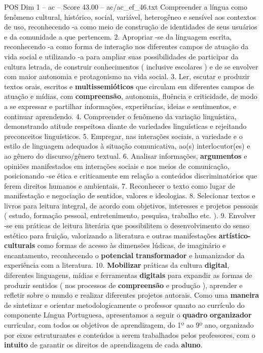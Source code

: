 \begin{textsample}{POS Dim 1 – ac – Score 43.00 – ac/ac\_ef\_46.txt}
Compreender a língua como fenômeno cultural, histórico, social, variável, heterogêneo e sensível aos contextos de uso, reconhecendo -a como meio de construção de identidades de seus usuários e da comunidade a que pertencem. 2.
Apropriar -se da linguagem escrita, reconhecendo -a como forma de interação nos diferentes campos de atuação da vida social e utilizando -a para ampliar suas possibilidades de participar da cultura letrada, de construir conhecimentos ( inclusive escolares ) e de se envolver com maior autonomia e protagonismo na vida social. 3.
Ler, escutar e produzir textos orais, escritos e \textbf{multissemióticos} que circulam em diferentes campos de atuação e mídias, com \textbf{compreensão}, autonomia, fluência e criticidade, de modo a se expressar e partilhar informações, experiências, ideias e sentimentos, e continuar aprendendo. 4.
Compreender o fenômeno da variação linguística, demonstrando atitude respeitosa diante de variedades linguísticas e rejeitando preconceitos linguísticos. 5.
Empregar, nas interações sociais, a variedade e o estilo de linguagem adequados à situação comunicativa, ao(s) interlocutor(es) e ao gênero do discurso/gênero textual. 6.
Analisar informações, \textbf{argumentos} e opiniões manifestados em interações sociais e nos meios de comunicação, posicionando -se ética e criticamente em relação a conteúdos discriminatórios que ferem direitos humanos e ambientais. 7.
Reconhecer o texto como lugar de manifestação e negociação de sentidos, valores e ideologias. 8.
Selecionar textos e livros para leitura integral, de acordo com objetivos, interesses e projetos pessoais ( estudo, formação pessoal, entretenimento, pesquisa, trabalho etc. ). 9.
Envolver -se em práticas de leitura literária que possibilitem o desenvolvimento do senso estético para fruição, valorizando a literatura e outras manifestações \textbf{artístico-culturais} como formas de acesso às dimensões lúdicas, de imaginário e encantamento, reconhecendo o \textbf{potencial} \textbf{transformador} e humanizador da experiência com a literatura. 10. \textbf{Mobilizar} práticas da cultura \textbf{digital}, diferentes linguagens, mídias e ferramentas \textbf{digitais} para expandir as formas de produzir sentidos ( nos processos de \textbf{compreensão} e produção ), aprender e refletir sobre o mundo e realizar diferentes projetos autorais.
Como uma \textbf{maneira} de sintetizar e orientar metodologicamente o professor quanto ao currículo do componente Língua Portuguesa, apresentamos a seguir o \textbf{quadro} \textbf{organizador} curricular, com todos os objetivos de aprendizagem, do 1º ao 9º ano, organizado por eixos estruturantes e conteúdos a serem trabalhados pelos professores, com o \textbf{intuito} de garantir os direitos de aprendizagem de cada \textbf{aluno}.


\end{textsample}
